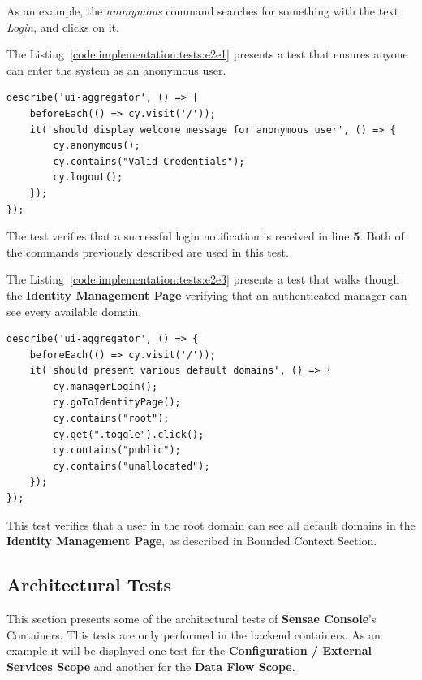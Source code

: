 As an example, the \textit{anonymous} command searches for something with the text \textit{Login}, and clicks on it.

The Listing~\ref{code:implementation:tests:e2e1} presents a test that ensures anyone can enter the system as an anonymous user.

\begin{lstlisting}[style=javascript, caption=End-to-End Test - Anonymous Authentication - \textbf{UI Aggregator}, label={code:implementation:tests:e2e1}]
describe('ui-aggregator', () => {
    beforeEach(() => cy.visit('/'));
    it('should display welcome message for anonymous user', () => {
        cy.anonymous();
        cy.contains("Valid Credentials");
        cy.logout();
    });
});
\end{lstlisting}

The test verifies that a successful login notification is received in line \textbf{5}. Both of the commands previously described are used in this test.

The Listing~\ref{code:implementation:tests:e2e3} presents a test that walks though the \textbf{Identity Management Page} verifying that an authenticated manager can see every available domain.

\begin{lstlisting}[style=javascript, caption=End-to-End Test - Discover Available Domains - \textbf{Identity Management}, label={code:implementation:tests:e2e3}]
describe('ui-aggregator', () => {
    beforeEach(() => cy.visit('/'));
    it('should present various default domains', () => {
        cy.managerLogin();
        cy.goToIdentityPage();
        cy.contains("root");
        cy.get(".toggle").click();
        cy.contains("public");
        cy.contains("unallocated");
    });
});
\end{lstlisting}

This test verifies that a user in the root domain can see all default domains in the \textbf{Identity Management Page}, as described in  Bounded Context Section.

\subsection{Architectural Tests}
\label{subsec:implementation:tests:arch}

This section presents some of the architectural tests of \textbf{Sensae Console}'s Containers. This tests are only performed in the backend containers.
As an example it will be displayed one test for the \textbf{Configuration / External Services Scope} and another for the \textbf{Data Flow Scope}.

